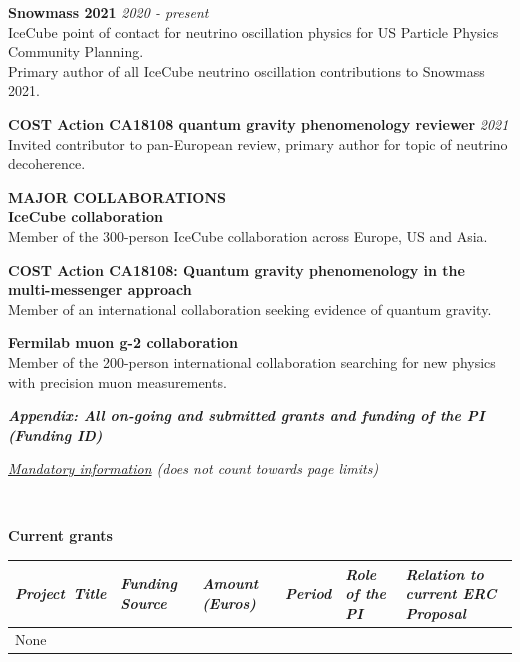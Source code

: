 \documentclass[a4paper,11pt]{article}
\renewcommand{\smallskip} {\vspace{0.1in}}
\begin{document}
{\bf Snowmass 2021 } \hfill {\em 2020 - present} \\ 
IceCube point of contact for neutrino oscillation physics for US Particle Physics Community Planning. \\
Primary author of all IceCube neutrino oscillation contributions to Snowmass 2021.

{\bf COST Action CA18108 quantum gravity phenomenology reviewer  } \hfill {\em 2021} \\ 
Invited contributor to pan-European review, primary author for topic of neutrino decoherence.

\vspace{0.2cm}
\textbf{MAJOR COLLABORATIONS ~~\hrulefill}\smallskip\\
%
{\bf IceCube collaboration} \\ 
Member of the 300-person IceCube collaboration across Europe, US and Asia.

{\bf COST Action CA18108: Quantum gravity phenomenology in the multi-messenger approach} \\ 
Member of an international collaboration seeking evidence of quantum gravity.

{\bf Fermilab muon g-2 collaboration} \\ 
Member of the 200-person international collaboration searching for new physics with precision muon measurements.


%
\newpage 




\centerline{ {\textit{\textbf{ Appendix: All on-going and submitted grants and funding of the PI (Funding ID)}}
}} \smallskip
\centerline{ \it \underline{Mandatory information} (does not count towards page limits)
}\smallskip

~\vspace{2cm}

{\bf Current grants}
\begin{table}[h]
\centering
\begin{tabularx}{1\textwidth}{|C{0.125\textwidth}|C{0.125\textwidth}|C{0.1\textwidth}|C{0.115\textwidth}|C{0.115\textwidth}|C{0.26\textwidth}|}
\hline
{} \it Project~Title & \it Funding Source & \it Amount (Euros) & \it Period & \it Role of the PI & \it Relation to current ERC Proposal\\
\hline
None  & & & & & \\
\hline
\end{tabularx}
\end{table}
\end{document}

